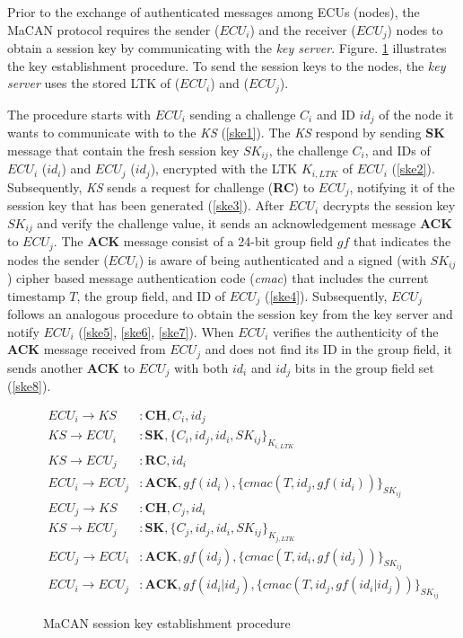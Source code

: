 \vspace*{0.05in}
Prior to the exchange of authenticated messages among ECUs (nodes), the MaCAN protocol requires the sender ($ECU_i$) and the receiver ($ECU_j$) nodes to obtain a session key by communicating with the \textit{key server}. Figure. \ref{fig:skest} illustrates the key establishment procedure. To send the session keys to the nodes, the \textit{key server} uses the stored LTK of ($ECU_i$) and ($ECU_j$).

The procedure starts with $ECU_i$ sending a challenge $C_i$ and ID $id_j$ of the node it wants to communicate with to the \textit{KS} (\ref{ske1}). The \textit{KS} respond by sending \textbf{SK} message that contain the fresh session key $SK_{ij}$, the challenge $C_i$, and IDs of $ECU_i$ ($id_i$) and $ECU_j$ ($id_j$), encrypted with the LTK $K_{i, LTK}$ of $ECU_i$ (\ref{ske2}). Subsequently, \textit{KS} sends
a request for challenge (\textbf{RC}) to $ECU_j$, notifying it of the session key that has been generated (\ref{ske3}). After $ECU_i$ decrypts the session key $SK_{ij}$ and verify the challenge value, it sends an acknowledgement message \textbf{ACK} to $ECU_j$. The \textbf{ACK} message consist of a 24-bit group field $gf$ that indicates the nodes the sender ($ECU_i$) is aware of being authenticated and a signed (with $SK_{ij}$) cipher based message authentication code (\textit{cmac}) that includes the current timestamp $T$, the group field, and ID of $ECU_j$ (\ref{ske4}). Subsequently, $ECU_j$ follows an analogous procedure to obtain the session key from the key server and notify $ECU_i$ (\ref{ske5}, \ref{ske6}, \ref{ske7}). When $ECU_i$ verifies the authenticity of the \textbf{ACK} message received from $ECU_j$ and does not find its ID in the group field, it sends another \textbf{ACK} to $ECU_j$ with both $id_i$ and $id_j$ bits in the group field set (\ref{ske8}).     
\vspace*{-0.15in}
\begin{figure}[h]
\begin{align}
 ECU_i \rightarrow KS &: \mathbf{CH}, C_i, id_j \label{ske1}\\ 
 KS \rightarrow ECU_i &: \mathbf{SK}, \{C_i, id_j, id_i, SK_{ij}\}_{K_{i,LTK}} \label{ske2}\\
 KS \rightarrow ECU_j &: \mathbf{RC}, id_i \label{ske3}\\ 
 ECU_i \rightarrow ECU_j &: \mathbf{ACK}, gf(id_i),\{cmac(T, id_j, gf(id_i))\}_{SK_{ij}} \label{ske4}\\
 ECU_j \rightarrow KS &: \mathbf{CH}, C_j, id_i \label{ske5}\\
 KS \rightarrow ECU_j &: \mathbf{SK}, \{C_j, id_j, id_i, SK_{ij}\}_{K_{j,LTK}} \label{ske6}\\
ECU_j \rightarrow ECU_i &: \mathbf{ACK}, gf(id_j), \{cmac(T, id_i, gf(id_j))\}_{SK_{ij}} \label{ske7}\\
ECU_i \rightarrow ECU_j &: \mathbf{ACK}, gf(id_i|id_j), \{cmac(T, id_j, gf(id_i|id_j))\}_{SK_{ij}} \label{ske8}
\end{align}
\vspace*{-0.2in}
\caption{MaCAN session key establishment procedure} \label{fig:skest}
\end{figure}

